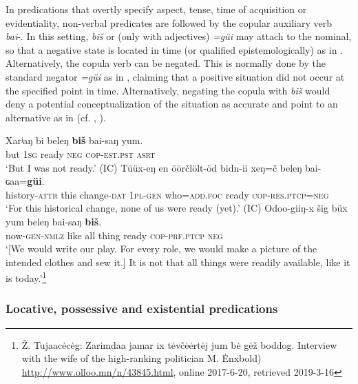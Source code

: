 \documentclass[output=paper,colorlinks,citecolor=brown,chinesefont]{langscibook}
\begin{document}
In predications that overtly specify aspect, tense, time of acquisition or evidentiality, non-verbal predicates are followed by the copular auxiliary verb \textit{bai}{}-. In this setting, \textit{biš} or (only with adjectives) \textit{=güi} may attach to the nominal, so that a negative state is located in time (or qualified epistemologically) as in . Alternatively, the copula verb can be negated. This is normally done by the standard negator \textit{=güi}  as in , claiming that a positive situation did not occur at the specified point in time. Alternatively, negating the copula with \textit{biš} would deny a potential conceptualization of the situation as accurate and point to an alternative as in  (cf. , ).

\ea\label{ex:kha:25}
   \ea\label{ex:kha:25a}
        \gll Xarʲaŋ bi beleŋ \textbf{biš} bai-saŋ yum. \\ 
             but \textsc{1sg} ready \textsc{neg} \textsc{cop-est.pst} \textsc{asrt} \\
        \glt ‘But I was not ready.’ (IC)
    \ex\label{ex:kha:25b}
        \gll Tüüx-eŋ en öörčlölt-öd bidn-ii xeŋ=č beleŋ bai-ɢaa=\textbf{güi}.\\ 
             history-\textsc{attr} this   change-\textsc{dat} \textsc{1pl-gen} who=\textsc{add.foc} ready \textsc{cop-res.ptcp=neg} \\
        \glt ‘For this historical change, none of us were ready (yet).’ (IC)
    \ex\label{ex:kha:25c}
        \gll Odoo-giiŋ-x   šig büx yum beleŋ bai-saŋ \textbf{biš}. \\ 
             now-\textsc{gen-nmlz} like all thing ready \textsc{cop-prf.ptcp} \textsc{neg} \\
        \glt ‘[We would write our play. For every role, we would make a picture of the intended clothes and sew it.] It is not that all things were readily available, like it is today.’\footnote{Ž. Tujaac\.ec\.eg: Zarimdaa jamar ix t\.evč\.e\.ert\.ej jum b\.e g\.ež boddog. Interview with the wife of the high-ranking politician M. \.Enxbold) \url{http://www.olloo.mn/n/43845.html}, online 2017-6-20, retrieved 2019-3-16}
    \z 
\z 


\subsubsection{Locative, possessive and existential predications} \label{sec:kha:2.3.2}
\end{document}
